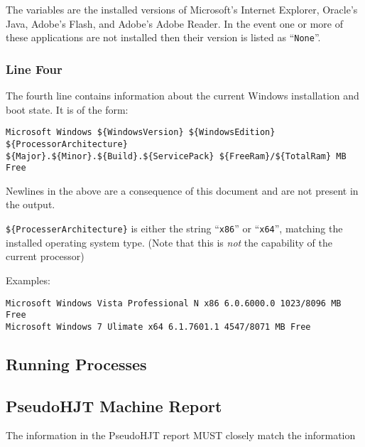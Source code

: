 \documentclass[letterpaper,12pt]{article}
\newcommand{\var}[1]{\texttt{\$\{#1\}}}
\begin{document}
The variables are the installed versions of Microsoft's Internet Explorer,
Oracle's Java, Adobe's Flash, and Adobe's Adobe Reader. In the event one or more
of these applications are not installed then their version is listed as
``\verb|None|''.

\subsubsection{Line Four}
The fourth line contains information about the current Windows installation and
boot state. It is of the form:
\begin{verbatim}
Microsoft Windows ${WindowsVersion} ${WindowsEdition} ${ProcessorArchitecture}
${Major}.${Minor}.${Build}.${ServicePack} ${FreeRam}/${TotalRam} MB Free
\end{verbatim}

Newlines in the above are a consequence of this document and are not present in
the output.

\var{ProcesserArchitecture} is either the string ``\verb|x86|'' or
``\verb|x64|'', matching the installed operating system type. (Note that this is
\textit{not} the capability of the current processor)

Examples:
\begin{verbatim}
Microsoft Windows Vista Professional N x86 6.0.6000.0 1023/8096 MB Free
Microsoft Windows 7 Ulimate x64 6.1.7601.1 4547/8071 MB Free
\end{verbatim}

\subsection{Running Processes}

\subsection{PseudoHJT Machine Report}
The information in the PseudoHJT report MUST closely match the information
\end{document}
